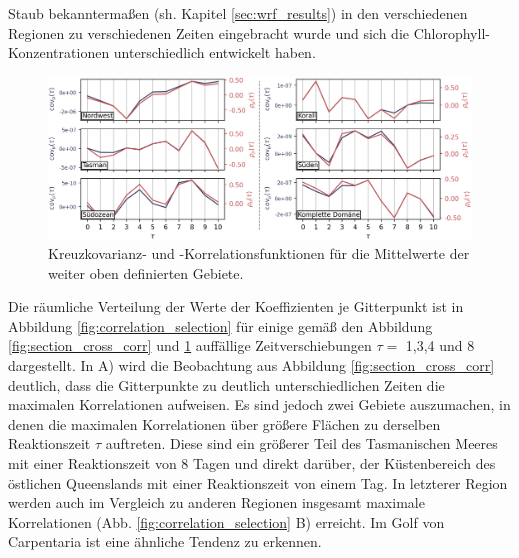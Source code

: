 \documentclass[12pt,a4paper,onecolumn,headheight=30pt]{scrartcl}
\begin{document}
Staub bekanntermaßen (sh. Kapitel \ref{sec:wrf_results}) in den verschiedenen Regionen zu verschiedenen Zeiten eingebracht wurde und sich die Chlorophyll-Konzentrationen unterschiedlich entwickelt haben.
\begin{figure}[htbp]
\includegraphics[width=\textwidth]{bilder/section_means_crosscorr_noadv.png}
\caption{Kreuzkovarianz- und -Korrelationsfunktionen für die Mittelwerte der weiter oben definierten Gebiete.} \label{fig:section_means_cross_corr}
\end{figure}
Die räumliche Verteilung der Werte der Koeffizienten je Gitterpunkt ist in Abbildung \ref{fig:correlation_selection} für einige gemäß den Abbildung \ref{fig:section_cross_corr} und \ref{fig:section_means_cross_corr} auffällige Zeitverschiebungen $\tau=$ 1,3,4 und 8 dargestellt. In A) wird die Beobachtung aus Abbildung \ref{fig:section_cross_corr} deutlich, dass die Gitterpunkte zu deutlich unterschiedlichen Zeiten die maximalen Korrelationen aufweisen. Es sind jedoch zwei Gebiete auszumachen, in denen die maximalen Korrelationen über größere Flächen zu derselben Reaktionszeit $\tau$ auftreten. Diese sind ein größerer Teil des Tasmanischen Meeres mit einer Reaktionszeit von 8 Tagen und direkt darüber, der Küstenbereich des östlichen Queenslands mit einer Reaktionszeit von einem Tag. In letzterer Region werden auch im Vergleich zu anderen Regionen insgesamt maximale Korrelationen (Abb. \ref{fig:correlation_selection} B) erreicht. Im Golf von Carpentaria ist eine ähnliche Tendenz zu erkennen. 
\end{document}
